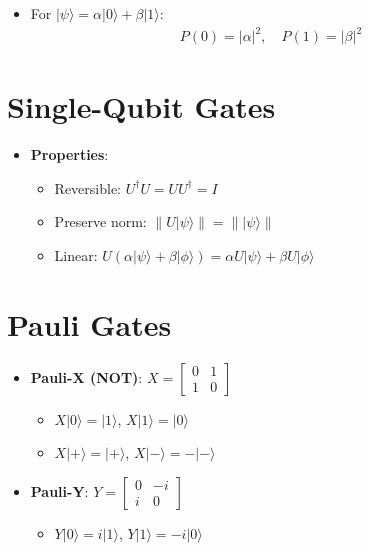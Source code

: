 \begin{multicols}{3}
\begin{itemize}[leftmargin=*,nosep,topsep=0pt]
      \item For $|\psi\rangle = \alpha|0\rangle + \beta|1\rangle$:
        \begin{align*}
          P(0) = |\alpha|^2, \quad P(1) = |\beta|^2
        \end{align*}

    \end{itemize}

    \section*{Single-Qubit Gates}
    \begin{itemize}[leftmargin=*,nosep,topsep=0pt]
      \item \textbf{Properties}:
        \begin{itemize}[nosep]
          \item Reversible: $U^\dagger U = UU^\dagger = I$

          \item Preserve norm: $\|U|\psi\rangle\| = \||\psi\rangle\|$

          \item Linear: $U(\alpha|\psi\rangle + \beta|\phi\rangle) = \alpha
            U|\psi\rangle + \beta U|\phi\rangle$

        \end{itemize}
    \end{itemize}

    \section*{Pauli Gates}
    \begin{itemize}[leftmargin=*,nosep,topsep=0pt]
      \item \textbf{Pauli-X (NOT)}: $X = \begin{bmatrix} 0 & 1 \\ 1 & 0
        \end{bmatrix}$
        \begin{itemize}[nosep]
          \item $X|0\rangle = |1\rangle$, $X|1\rangle = |0\rangle$
          \item $X|+\rangle = |+\rangle$, $X|-\rangle = -|-\rangle$
        \end{itemize}

        \item \textbf{Pauli-Y}: $Y = \begin{bmatrix} 0 & -i \\ i & 0 \end{bmatrix}$
          \begin{itemize}[nosep]
            \item $Y|0\rangle = i|1\rangle$, $Y|1\rangle = -i|0\rangle$
          \end{itemize}


\end{itemize}
\end{multicols}
